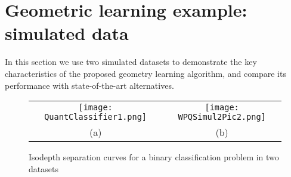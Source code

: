\documentclass[twoside]{article}
\begin{document}
 
 \section{Geometric learning example: simulated data}
 \label{sec:DataAnalysis}
 
In this section we use two simulated datasets to demonstrate the key 
characteristics of the proposed geometry learning algorithm, and compare 
its performance with state-of-the-art alternatives.  



%
%
%



\begin{figure*}[htb]
\vspace{0.05cm}
\centering 
\begin{tabular}{| c | c |}
\hline 
\texttt{[image: QuantClassifier1.png]}
&
\texttt{[image: WPQSimul2Pic2.png]}\\
(a) & (b)  \\
\hline 
\end{tabular}
\caption{Isodepth separation curves for a binary classification problem 
in two datasets}
\label{fig:SimulatedExample}
\end{figure*}
\end{document}
